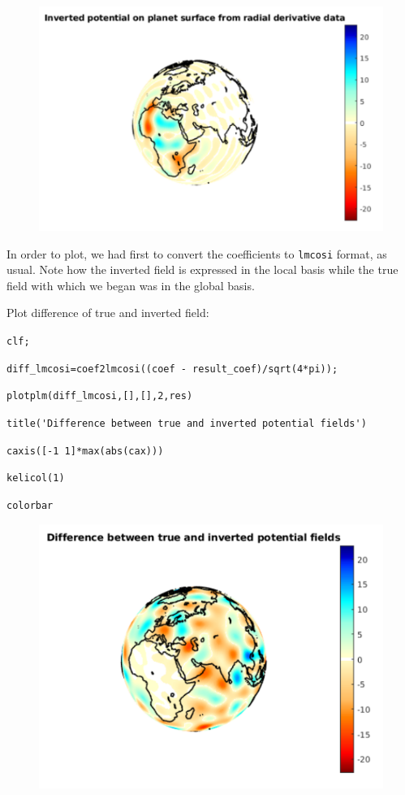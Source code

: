 \documentclass{article}
\begin{document}
\begin{figure}[H]
\includegraphics[scale=.6]{inverted_potential}
\end{figure}

\setlength{\parskip}{0.5cm plus4mm minus3mm}

In order to plot, we had first to convert the coefficients to \verb!lmcosi! format, as usual. Note how the inverted field is expressed in the local basis while the true field with which we began was in the global basis.


Plot difference of true and inverted field:


\vspace{3mm}

\setlength{\parskip}{.1mm}

\verb!clf;!

\verb!diff_lmcosi=coef2lmcosi((coef - result_coef)/sqrt(4*pi));!

\verb!plotplm(diff_lmcosi,[],[],2,res)!

\verb!title('Difference between true and inverted potential fields')!

\verb!caxis([-1 1]*max(abs(cax)))!

\verb!kelicol(1)!

\verb!colorbar !

\begin{figure}[H]
\includegraphics[scale=.65]{difference_potential}
\end{figure}
\end{document}
